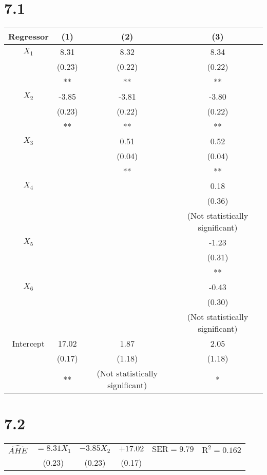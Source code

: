 \documentclass[letterpaper,12pt,titlepage,oneside,final]{book}
\begin{document}





\section*{7.1}

\begin{center}
\begin{tabular}{|c || c | c | c|} 
 \hline
 Regressor & (1) & (2) & (3) \\ [0.5ex] 
 \hline\hline
 $X_1$ & 8.31 & 8.32 & 8.34 \\
 & (0.23) & (0.22) &(0.22) \\
  & ** & ** & ** \\
 \hline
 $X_2$ & -3.85 & -3.81 & -3.80 \\
  & (0.23) & (0.22) &(0.22) \\
   & ** & ** & ** \\
 \hline
 $X_3$ &  & 0.51 & 0.52 \\
  &  & (0.04) &(0.04) \\
   &  & ** & ** \\
 \hline
 $X_4$ &  &  & 0.18 \\
  & & &(0.36) \\
   & &  & (Not statistically significant) \\
 \hline
 $X_5$ & & & -1.23 \\ 
  & & &(0.31) \\
     &  & & ** \\
 \hline
 $X_6$ & & & -0.43 \\ 
  & & &(0.30) \\
  & &  & (Not statistically significant) \\
 \hline
  Intercept & 17.02 & 1.87 & 2.05 \\ 
   & (0.17) & (1.18) &(1.18) \\
   & **  & (Not statistically significant) & * \\[1ex] 
 \hline
\end{tabular}
\end{center}


\section*{7.2}
\begin{center}
\begin{tabular}{c c c c c c} 
$\widehat{AHE}$ & $= 8.31X_{1}$ & $- 3.85X_{2}$ & $+ 17.02$ & $\text{SER} =9.79$ & $\text{R}^{2} = 0.162$ \\
  & (0.23) & (0.23) &(0.17) \\
\end{tabular}
\end{center}
\end{document}
